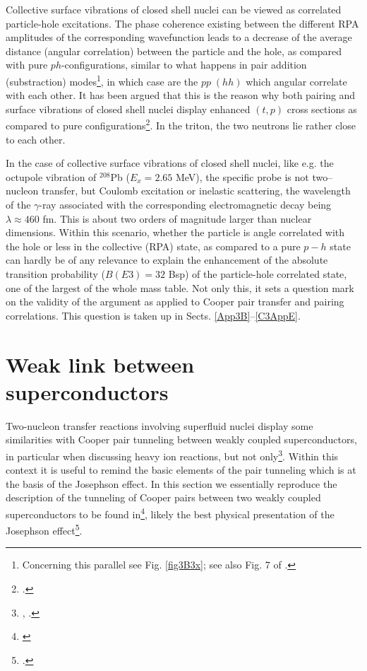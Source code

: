 Collective surface vibrations of closed shell nuclei can be viewed as correlated particle-hole excitations. The phase coherence existing between the different RPA amplitudes of the corresponding wavefunction leads to a decrease of the average distance (angular correlation) between the particle and the hole, as compared with pure $ph$-configurations, similar to what happens in pair addition (substraction) modes\footnote{Concerning this parallel see Fig. \ref{fig3B3x}; see also Fig. 7 of \cite{Barranco:19b}.},  in which case are the $pp\;(hh)$ which angular correlate with each other. It has been argued that this is the reason why both pairing and surface vibrations of closed shell nuclei display enhanced $(t,p)$ cross sections as compared to pure configurations\footnote{\cite{Bertsch:67}.}. In the triton, the two neutrons lie rather close to each other.


In the case of collective surface vibrations of closed shell nuclei, like e.g. the octupole vibration of $^{208}$Pb ($E_x=2.65$ MeV), the specific probe is not two--nucleon transfer, but Coulomb excitation or inelastic scattering,  the wavelength of the $\gamma$-ray associated with the corresponding electromagnetic decay being $\lambda\approx 460$ fm. This is about two orders of magnitude larger than nuclear dimensions. Within this scenario, whether  the particle is angle correlated with the hole or less in the collective (RPA) state, as compared to a pure $p-h$ state can hardly be of any relevance to explain  the enhancement of the absolute transition probability ($B(E3)=32$ Bsp) of the particle-hole correlated state, one of the largest of the whole mass table. Not only this, it sets a question mark on the validity of the argument as applied to Cooper pair transfer and pairing correlations. This question is taken up in Sects.  
\ref{App3B}--\ref{C3AppE}.








\section{Weak link between superconductors}\label{C3AppC}
Two-nucleon transfer reactions involving superfluid nuclei display some similarities with Cooper pair tunneling between weakly coupled superconductors, in particular when discussing heavy ion reactions, but not only\footnote{\cite{Goldanskii:68,Dietrich:70,Dietrich:71,Hara:71,Kleber:71,Weiss:79}, \cite{vonOertzen:01,Oertzen:13,Broglia:04a}.}. Within this context it is useful to remind the basic elements of the pair tunneling which is at the basis of the Josephson effect. 
In this section we essentially reproduce the description of the tunneling of Cooper pairs between two weakly coupled superconductors to be found in\footnote{\cite{Anderson:64b}}, likely the best physical presentation of the Josephson effect\footnote{\cite{Josephson:62}.}.


